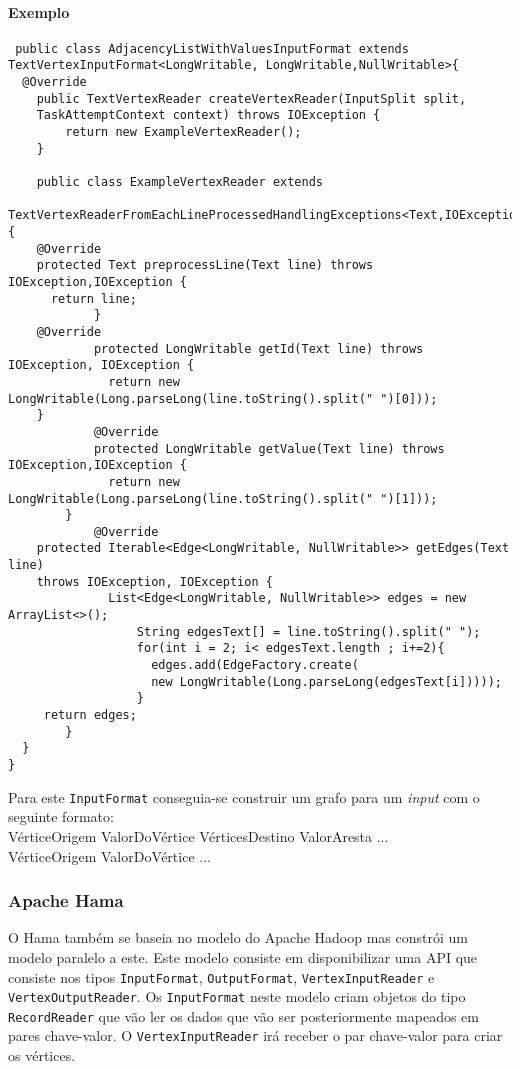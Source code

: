 \paragraph{Exemplo}
\begin{verbatim}
 public class AdjacencyListWithValuesInputFormat extends 
TextVertexInputFormat<LongWritable, LongWritable,NullWritable>{
  @Override
	public TextVertexReader createVertexReader(InputSplit split,
	TaskAttemptContext context) throws IOException { 
	    return new ExampleVertexReader();
	}
	
	public class ExampleVertexReader extends 
	TextVertexReaderFromEachLineProcessedHandlingExceptions<Text,IOException>{
    @Override
    protected Text preprocessLine(Text line) throws IOException,IOException {
      return line;
		    }
    @Override
		    protected LongWritable getId(Text line) throws IOException, IOException {
		      return new LongWritable(Long.parseLong(line.toString().split(" ")[0]));
    }
		    @Override
		    protected LongWritable getValue(Text line) throws IOException,IOException {
		      return new LongWritable(Long.parseLong(line.toString().split(" ")[1]));
	    }
		    @Override
    protected Iterable<Edge<LongWritable, NullWritable>> getEdges(Text line)
    throws IOException, IOException {
		      List<Edge<LongWritable, NullWritable>> edges = new ArrayList<>();
			      String edgesText[] = line.toString().split(" ");
			      for(int i = 2; i< edgesText.length ; i+=2){
			        edges.add(EdgeFactory.create(
			        new LongWritable(Long.parseLong(edgesText[i]))));
			      }
     return edges;
	    }
  }
}
\end{verbatim}

Para este \texttt{InputFormat} conseguia-se construir um grafo para um 
\textit{input} com o seguinte formato:\\
VérticeOrigem ValorDoVértice VérticesDestino ValorAresta ... \\
VérticeOrigem ValorDoVértice ...

\subsubsection*{Apache Hama}

O Hama também se baseia no modelo do Apache Hadoop mas constrói um modelo paralelo a este.
Este modelo consiste em disponibilizar uma API que consiste nos tipos \texttt{InputFormat}, \texttt{OutputFormat}, \texttt{VertexInputReader} e \texttt{VertexOutputReader}. Os \texttt{InputFormat} neste modelo criam objetos do tipo \texttt{RecordReader} 
que vão ler os dados que vão ser posteriormente mapeados em pares chave-valor. O \texttt{VertexInputReader} irá receber o par chave-valor para criar os
vértices.

